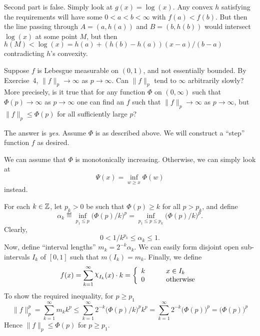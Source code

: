 \begin{enumerate}
Second part is false. Simply look at \(g(x)=\log(x)\). Any convex $h$
satisfying the requirements will have some \(0<a<b<\infty\)
with \(f(a)<f(b)\). But then the line passing through
\(A=(a,h(a))\) and
\(B=(b,h(b))\)
would intersect \(\log(x)\) at some point $M$, but then
\(h(M)<\log(x) = h(a) + (h(b)-h(a))(x-a)/(b-a)\)
contradicting $h$'s convexity.

\begin{excopy}
Suppose $f$ is Lebesgue measurable on \((0,1)\), and not essentially bounded.
By Exercise~4, \(\|f\|_p\to\infty\) as \(p\to\infty\).
Can \(\|f\|_p\) tend to \(\infty\) arbitrarily slowly?
More precisely, is it true that for any function \(\Phi\) on \((0,\infty)\)
such that \(\Phi(p)\to\infty\) as \(p\to\infty\) one can find an $f$ such that
\(\|f\|_p\to\infty\) as \(p\to\infty\), but
\(\|f\|_p \leq \Phi(p)\) for all sufficiently large $p$?
\end{excopy}

The answer is \emph{yes}. Assume \(\Phi\) is as described above.
We will construct a ``step'' function $f$ as desired.

We can assume that \(\Phi\) is monotonically increasing.
Otherwise, we can simply look at
\begin{equation*}
 \Psi(x) = \inf_{w\geq x}\Phi(w)
\end{equation*}
instead.

For each \(k\in\mathbb{Z}\),
let \(p_k>0\) be such that \(\Phi(p)\geq k\) for all \(p>p_k\),
and define
\begin{equation*}
 \alpha_k
 \eqdef \inf_{p_1\leq p } \bigl(\Phi(p)/k\bigr)^p
 = \inf_{p_1\leq p \leq p_k } \bigl(\Phi(p)/k\bigr)^p.
\end{equation*}
Clearly,
\begin{equation*}
0 < 1/k^{p_k} \leq \alpha_k \leq 1.
\end{equation*}
Now, define ``interval lengths'' \(m_k = 2^{-k}\alpha_k\).
We can easily form disjoint open sub-intervals \(I_k\) of \([0,1]\)
such that \(m(I_k) = m_k\). Finally, we define
\begin{equation*}
f(x) = \sum_{k=1}^\infty \chhi_{I_k}(x) \cdot k =
    \left\{\begin{array}{ll}
             k & \qquad x\in I_k\\
             0 & \qquad \textrm{otherwise}
           \end{array}\right.
\end{equation*}
To show the required inequality, for \(p\geq p_1\)
\begin{equation*}
\|f\|_p^p
  = \sum_{k=1}^\infty m_k k^p
  \leq \sum_{k=1}^\infty 2^{-k} \bigl(\Phi(p)/k\bigr)^p k^p
  = \sum_{k=1}^\infty 2^{-k} \bigl(\Phi(p)\bigr)^p
  = \bigl(\Phi(p)\bigr)^p
\end{equation*}
Hence \(\|f\|_p \leq \Phi(p)\) for \(p\geq p_1\).



\end{enumerate}
